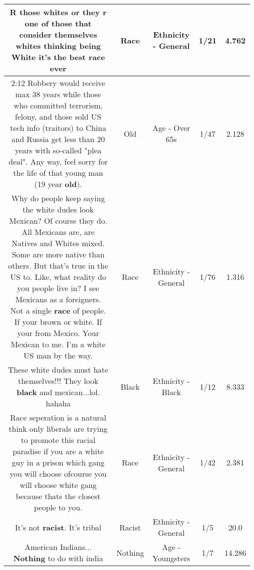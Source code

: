 \documentclass[11pt]{article}
\newlength\mylength
\begin{document}
\begin{center}
\begin{longtable}{|C{.65\mylength}|C{.30\mylength}|C{.12\mylength}|C{.12\mylength}|C{.12\mylength}|}
  \small R those whites or they r one of those that consider themselves whites thinking being White it's the best \textbf{race} ever\normalsize   & Race & Ethnicity - General & 1/21 & 4.762 \\  \hline
  \small \@2:12 Robbery would receive max 38 years while those who committed terrorism, felony, and those sold US tech info (traitors) to China and Russia get less than 20 years with so-called "plea deal".  Any way, feel sorry for the life of that young man (19 year \textbf{old}).\normalsize   & Old & Age - Over 65s & 1/47 & 2.128 \\  \hline
  \small Why do people keep saying the white dudes look Mexican? Of course they do. All Mexicans are, are Natives and Whites mixed. Some are more native than others. But that's true in the US to. Like, what reality do you people live in? I see Mexicans as a foreigners. Not a single \textbf{race} of people. If your brown or white. If your from Mexico. Your Mexican to me. I'm a white US man by the way.\normalsize   & Race & Ethnicity - General & 1/76 & 1.316 \\  \hline
  \small These white dudes must hate themselves!!! They look \textbf{black} and mexican...lol.  hahaha\normalsize   & Black & Ethnicity - Black & 1/12 & 8.333 \\  \hline
  \small Race seperation is a natural think only liberals are trying to promote this racial paradise if you are a white guy in a prison which gang you will choose ofcourse you will choose white gang because thats the closest people to you.\normalsize   & Race & Ethnicity - General & 1/42 & 2.381 \\  \hline
  \small It's not \textbf{racist}. It's tribal\normalsize   & Racist & Ethnicity - General & 1/5 & 20.0 \\  \hline
  \small American Indians... \textbf{Nothing} to do with india\normalsize   & Nothing & Age - Youngsters & 1/7 & 14.286 \\  \hline

\end{longtable}
\end{center}
\end{document}
